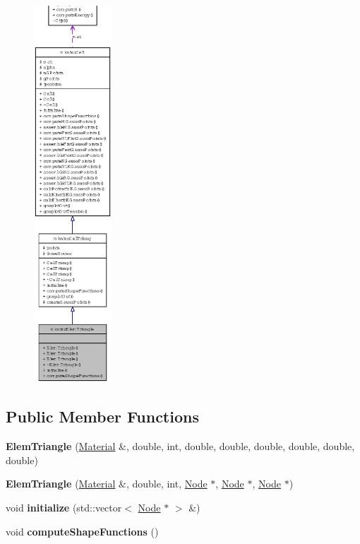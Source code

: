 \begin{figure}[H]
\begin{center}
\leavevmode
\includegraphics[height=400pt]{classmknix_1_1ElemTriangle__coll__graph}
\end{center}
\end{figure}
\subsection*{Public Member Functions}
\begin{CompactItemize}
\item 
\hypertarget{classmknix_1_1ElemTriangle_cc6735c1a85d1c9d1fa1bbf1d3ed9e24}{
\textbf{ElemTriangle} (\hyperlink{classmknix_1_1Material}{Material} \&, double, int, double, double, double, double, double, double)}
\label{classmknix_1_1ElemTriangle_cc6735c1a85d1c9d1fa1bbf1d3ed9e24}

\item 
\hypertarget{classmknix_1_1ElemTriangle_01f7c2e3827dcfbc657b17aa6610b8dc}{
\textbf{ElemTriangle} (\hyperlink{classmknix_1_1Material}{Material} \&, double, int, \hyperlink{classmknix_1_1Node}{Node} $\ast$, \hyperlink{classmknix_1_1Node}{Node} $\ast$, \hyperlink{classmknix_1_1Node}{Node} $\ast$)}
\label{classmknix_1_1ElemTriangle_01f7c2e3827dcfbc657b17aa6610b8dc}

\item 
\hypertarget{classmknix_1_1ElemTriangle_5ddf93646f4b35632801fd28bc8e14a2}{
void \textbf{initialize} (std::vector$<$ \hyperlink{classmknix_1_1Node}{Node} $\ast$ $>$ \&)}
\label{classmknix_1_1ElemTriangle_5ddf93646f4b35632801fd28bc8e14a2}

\item 
\hypertarget{classmknix_1_1ElemTriangle_6d97673aa922fca3c84ae23255b76223}{
void \textbf{computeShapeFunctions} ()}
\label{classmknix_1_1ElemTriangle_6d97673aa922fca3c84ae23255b76223}

\end{CompactItemize}


